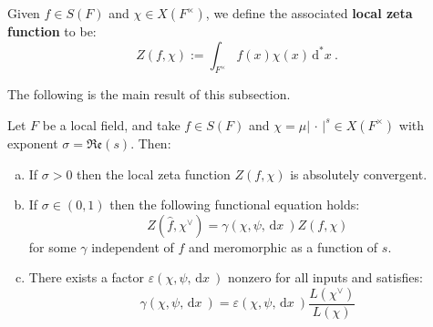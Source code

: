 \documentclass[11pt, x11names]{article}
\newcommand{\abs}[1]{\left| \, #1  \,\right|}
\renewcommand{\hat}{\widehat}
\newcommand{\re}[1]{\mathfrak{Re} \left( #1 \right)}
\newcommand{\dx}{\, \mathrm{d}x \ }
\renewcommand{\d}[1]{\, \mathrm{d}#1 \ }
\begin{document}
\begin{defn}
\label{def: local zeta function}
    Given $f \in S(F)$ and $\chi \in X(F^\times)$, we define the associated \textbf{local zeta function} to be:
    \begin{equation*}
        Z(f, \chi) := \int_{F^\times} f(x)\chi(x)\d{^*x}.
    \end{equation*} 
\end{defn}

The following is the main result of this subsection.

\begin{theorem}
\label{thm: local zeta function convergence and func-eqn}
    Let $F$ be a local field, and take  $f \in S(F)$ and $\chi = \mu \abs{\cdot}^s \in X(F^\times)$ with exponent $\sigma = \re{s}$. Then:
    \begin{enumerate}[(a)]
        \item \label{thmitem: abs-convg of local zeta function} If $\sigma > 0$ then the local zeta function $Z(f, \chi)$ is absolutely convergent.
        \item \label{thmitem: functional-eqn of local zeta func} If $\sigma \in (0, 1)$ then the following functional equation holds:
        \begin{equation*}
            Z(\hat{f}, \chi^\lor) = \gamma(\chi, \psi, \dx) Z(f, \chi)
        \end{equation*}
        for some $\gamma$ independent of $f$ and meromorphic as a function of $s$.
        \item \label{thmitem: epsilon factor local-zeta-func}There exists a factor $\varepsilon(\chi, \psi, \dx)$ nonzero for all inputs and satisfies:
        \begin{equation*}
            \gamma(\chi, \psi, \dx ) = \varepsilon(\chi, \psi, \dx) \frac{L(\chi^\lor)}{L(\chi)}
        \end{equation*}
    \end{enumerate} 
\end{theorem}
\end{document}
